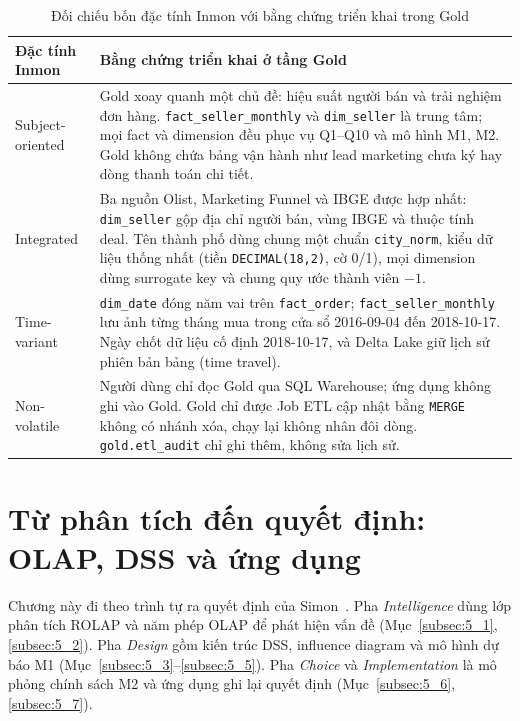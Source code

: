 \documentclass[a4paper]{article}
\begin{document}
\begin{table}[htbp]
\centering
\footnotesize
\renewcommand{\arraystretch}{1.1}
\caption{Đối chiếu bốn đặc tính Inmon với bằng chứng triển khai trong Gold}
\label{tab:inmon_evidence}
\begin{tabularx}{\textwidth}{@{}>{\raggedright\arraybackslash}p{2.6cm}>{\raggedright\arraybackslash}X@{}}
\toprule
\textbf{Đặc tính Inmon} & \textbf{Bằng chứng triển khai ở tầng Gold} \\
\midrule
Subject-oriented & Gold xoay quanh một chủ đề: hiệu suất người bán và trải nghiệm đơn hàng. \texttt{fact\_seller\_monthly} và \texttt{dim\_seller} là trung tâm; mọi fact và dimension đều phục vụ Q1--Q10 và mô hình M1, M2. Gold không chứa bảng vận hành như lead marketing chưa ký hay dòng thanh toán chi tiết. \\
\addlinespace
Integrated & Ba nguồn Olist, Marketing Funnel và IBGE được hợp nhất: \texttt{dim\_seller} gộp địa chỉ người bán, vùng IBGE và thuộc tính deal. Tên thành phố dùng chung một chuẩn \texttt{city\_norm}, kiểu dữ liệu thống nhất (tiền \texttt{DECIMAL(18,2)}, cờ 0/1), mọi dimension dùng surrogate key và chung quy ước thành viên $-1$. \\
\addlinespace
Time-variant & \texttt{dim\_date} đóng năm vai trên \texttt{fact\_order}; \texttt{fact\_seller\_monthly} lưu ảnh từng tháng mua trong cửa sổ 2016-09-04 đến 2018-10-17. Ngày chốt dữ liệu cố định 2018-10-17, và Delta Lake giữ lịch sử phiên bản bảng (time travel). \\
\addlinespace
Non-volatile & Người dùng chỉ đọc Gold qua SQL Warehouse; ứng dụng không ghi vào Gold. Gold chỉ được Job ETL cập nhật bằng \texttt{MERGE} không có nhánh xóa, chạy lại không nhân đôi dòng. \texttt{gold.etl\_audit} chỉ ghi thêm, không sửa lịch sử. \\
\bottomrule
\end{tabularx}
\end{table}

\section{Từ phân tích đến quyết định: OLAP, DSS và ứng dụng}
\label{sec:ch5}

Chương này đi theo trình tự ra quyết định của Simon~\cite{bib:simon1960}. Pha \textit{Intelligence} dùng lớp phân tích ROLAP và năm phép OLAP để phát hiện vấn đề (Mục~\ref{subsec:5_1}, \ref{subsec:5_2}). Pha \textit{Design} gồm kiến trúc DSS, influence diagram và mô hình dự báo M1 (Mục~\ref{subsec:5_3}--\ref{subsec:5_5}). Pha \textit{Choice} và \textit{Implementation} là mô phỏng chính sách M2 và ứng dụng ghi lại quyết định (Mục~\ref{subsec:5_6}, \ref{subsec:5_7}).
\end{document}
